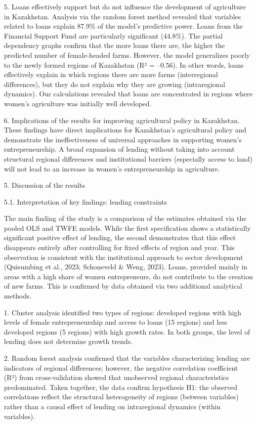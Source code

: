 \documentclass[
]{article}
\begin{document}
5. Loans effectively support but do not influence the development of
agriculture in Kazakhstan. Analysis via the random forest method
revealed that variables related to loans explain 87.9\% of the model's
predictive power. Loans from the Financial Support Fund are particularly
significant (44.8\%). The partial dependency graphs confirm that the
more loans there are, the higher the predicted number of female-headed
farms. However, the model generalizes poorly to the newly formed regions
of Kazakhstan (R² = --0.56). In other words, loans effectively explain
in which regions there are more farms (interregional differences), but
they do not explain why they are growing (intraregional dynamics). Our
calculations revealed that loans are concentrated in regions where
women's agriculture was initially well developed.

6. Implications of the results for improving agricultural policy in
Kazakhstan. These findings have direct implications for Kazakhstan's
agricultural policy and demonstrate the ineffectiveness of universal
approaches in supporting women's entrepreneurship. A broad expansion of
lending without taking into account structural regional differences and
institutional barriers (especially access to land) will not lead to an
increase in women's entrepreneurship in agriculture.

5. Discussion of the results

5.1. Interpretation of key findings: lending constraints

The main finding of the study is a comparison of the estimates obtained
via the pooled OLS and TWFE models. While the first specification shows
a statistically significant positive effect of lending, the second
demonstrates that this effect disappears entirely after controlling for
fixed effects of region and year. This observation is consistent with
the institutional approach to sector development (Quisumbing et al.,
2023; Schoneveld \& Weng, 2023). Loans, provided mainly in areas with a
high share of women entrepreneurs, do not contribute to the creation of
new farms. This is confirmed by data obtained via two additional
analytical methods.

1. Cluster analysis identified two types of regions: developed regions
with high levels of female entrepreneurship and access to loans (15
regions) and less developed regions (5 regions) with high growth rates.
In both groups, the level of lending does not determine growth trends.

2. Random forest analysis confirmed that the variables characterizing
lending are indicators of regional differences; however, the negative
correlation coefficient (R²) from cross-validation showed that
unobserved regional characteristics predominated. Taken together, the
data confirm hypothesis H1: the observed correlations reflect the
structural heterogeneity of regions (between variables) rather than a
causal effect of lending on intraregional dynamics (within variables).
\end{document}
